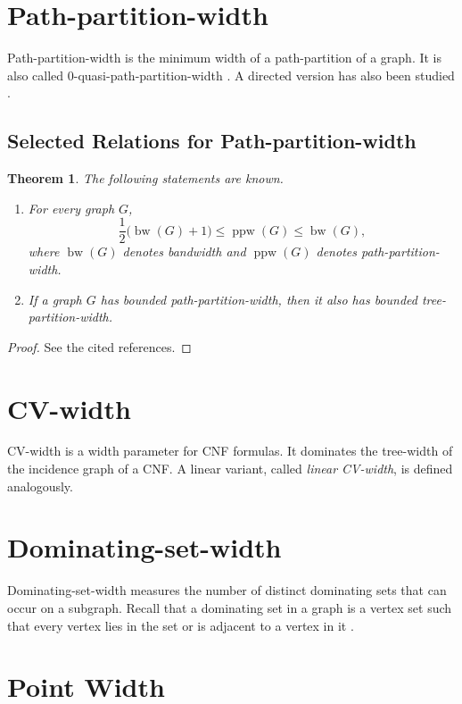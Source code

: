 \documentclass[10pt]{book}
\newtheorem{theorem}{Theorem}[section]
\theoremstyle{definition}
\begin{document}
\section{Path-partition-width}
Path-partition-width is the minimum width of a path-partition of a graph.  
It is also called \(0\)-quasi-path-partition-width \cite{253}.  
A directed version has also been studied \cite{191}.

\subsection{Selected Relations for Path-partition-width}

\begin{theorem}
The following statements are known.
\begin{enumerate}
    \item For every graph \(G\),
    \[
    \frac{1}{2}\bigl(\operatorname{bw}(G)+1\bigr)\leq \operatorname{ppw}(G)\leq \operatorname{bw}(G),
    \]
    where \(\operatorname{bw}(G)\) denotes bandwidth and \(\operatorname{ppw}(G)\) denotes path-partition-width. \cite{dujmovic2007graph}

    \item If a graph \(G\) has bounded path-partition-width, then it also has bounded tree-partition-width.
\end{enumerate}
\end{theorem}

\begin{proof}
See the cited references.
\end{proof}

\section{CV-width}
CV-width \cite{59} is a width parameter for CNF formulas.  
It dominates the tree-width of the incidence graph of a CNF.  
A linear variant, called \emph{linear CV-width}, is defined analogously.

\section{Dominating-set-width}
Dominating-set-width \cite{60} measures the number of distinct dominating sets that can occur on a subgraph.  
Recall that a dominating set in a graph is a vertex set such that every vertex lies in the set or is adjacent to a vertex in it \cite{Wang2017ANC}.

\section{Point Width}
\end{document}
